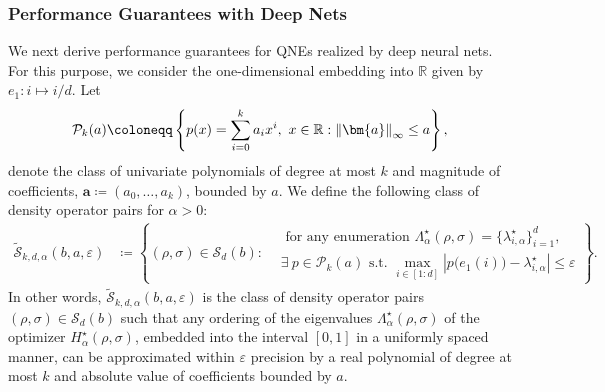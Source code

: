 \documentclass[a4paper,onecolumn,11pt,accepted=2026-05-12]{quantumarticle}
\newcommand{\norm}[1]{\left\Vert#1\right\Vert}
\newcommand{\abs}[1]{\left\vert#1\right\vert}
\newcommand{\cP}{\mathcal{P}}
\newcommand{\cS}{\mathcal{S}}
\newcommand{\RR}{\mathbb{R}}
\begin{document}
\subsubsection*{Performance Guarantees with Deep Nets}
We next derive performance guarantees for QNEs realized by deep neural nets.
For this purpose, we consider the  one-dimensional embedding into $\RR$ given by $e_1\colon i \mapsto i/d$. Let 
\begin{align}
 \cP_k(a)  \coloneqq  \left\{p(x)=\sum_{i=0}^k a_i x^i, ~ x \in \RR:  \norm{\bm{a}}_{\infty} \leq a \right\},  \notag
\end{align}
denote the class of univariate  polynomials of degree at most $k$ and magnitude of coefficients, $\bm{a} \coloneqq (a_0,\ldots,a_k)$, bounded by $a$. 
We define the following class of density operator pairs for  $\alpha>0$:
\begin{align}
   \tilde{\cS}_{k,d,\alpha}(b,a, \varepsilon)& \coloneqq \left\{(\rho,\sigma) \in \cS_d(b):\begin{aligned}
       & \mbox{ for any enumeration } \Lambda_{\alpha}^{\star}(\rho,\sigma)=\{\lambda_{i,\alpha}^{\star}\}_{i=1}^d, \\& \exists~p \in  \cP_k(a)\mbox{ s.t. }  \max_{i \in [1:d]}\abs{p\big(e_1(i)\big)-\lambda_{i,\alpha}^{\star}}\leq \varepsilon
\end{aligned}\right\}.\label{eq:densityclass}
\end{align}
In other words, $ \tilde{\cS}_{k,d,\alpha}(b,a,\varepsilon)$ is the class of density operator pairs $(\rho,\sigma) \in \cS_d(b)$ such that any ordering of the eigenvalues $\Lambda_{\alpha}^{\star}(\rho,\sigma)$  of the optimizer $H_{\alpha}^{\star}(\rho,\sigma)$,  embedded into the interval $[0,1]$ in a uniformly spaced manner, can be approximated within $\varepsilon$ precision by a real polynomial of degree at most $k$ and absolute value of coefficients bounded by $a$. 
\end{document}
